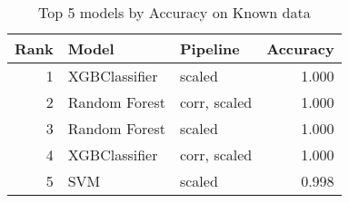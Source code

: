 \begin{table}[!htb]
\centering
\begin{tabular}{rllr}
\toprule
Rank & Model & Pipeline & Accuracy \\
\midrule
1 & XGBClassifier & scaled & 1.000 \\
2 & Random Forest & corr, scaled & 1.000 \\
3 & Random Forest & scaled & 1.000 \\
4 & XGBClassifier & corr, scaled & 1.000 \\
5 & SVM & scaled & 0.998 \\
\bottomrule
\end{tabular}
\caption{Top 5 models by Accuracy on Known data}
\label{table-top-5-accuracy-known}
\end{table}
